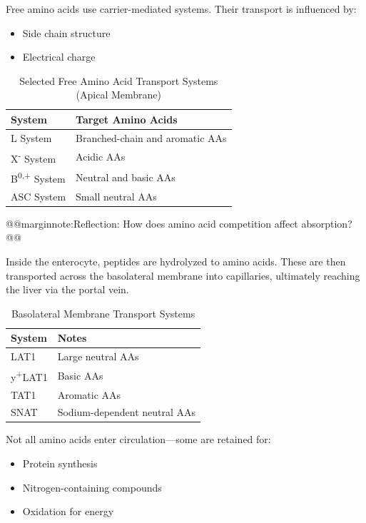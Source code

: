 \documentclass{tufte-handout}
\makeatletter
\def\marginnote#1{@@marginnote:#1@@}
\makeatother
\begin{document}
Free amino acids use carrier-mediated systems. Their transport is influenced by:
\begin{itemize}
  \item Side chain structure
  \item Electrical charge
\end{itemize}

\begin{table}[h]
\caption{Selected Free Amino Acid Transport Systems (Apical Membrane)}
\begin{tabular}{ll}
\toprule
\textbf{System} & \textbf{Target Amino Acids} \\
\midrule
L System & Branched-chain and aromatic AAs \\
X\textsuperscript{-} System & Acidic AAs \\
B\textsuperscript{0,+} System & Neutral and basic AAs \\
ASC System & Small neutral AAs \\
\bottomrule
\end{tabular}
\end{table}

\marginnote{Reflection: How does amino acid competition affect absorption?}

Inside the enterocyte, peptides are hydrolyzed to amino acids. These are then transported across the basolateral membrane into capillaries, ultimately reaching the liver via the portal vein.

\begin{table}[h]
\caption{Basolateral Membrane Transport Systems}
\begin{tabular}{ll}
\toprule
\textbf{System} & \textbf{Notes} \\
\midrule
LAT1 & Large neutral AAs \\
y\textsuperscript{+}LAT1 & Basic AAs \\
TAT1 & Aromatic AAs \\
SNAT & Sodium-dependent neutral AAs \\
\bottomrule
\end{tabular}
\end{table}

Not all amino acids enter circulation—some are retained for:
\begin{itemize}
  \item Protein synthesis
  \item Nitrogen-containing compounds
  \item Oxidation for energy
\end{itemize}
\end{document}
